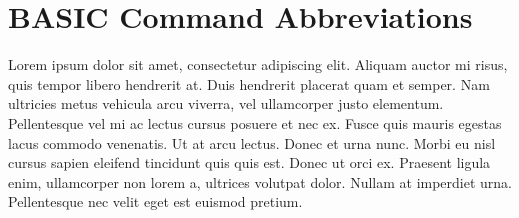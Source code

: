 \documentclass[
	11pt, %
	fleqn, %
	letterpaper, %
]{CommodoreBlueBook}
\begin{document}

\chapter{BASIC Command Abbreviations}

Lorem ipsum dolor sit amet, consectetur adipiscing elit. Aliquam auctor mi
	risus, quis tempor libero hendrerit at. Duis hendrerit placerat quam et
	semper. Nam ultricies metus vehicula arcu viverra, vel ullamcorper justo
	elementum. Pellentesque vel mi ac lectus cursus posuere et nec ex. Fusce
	quis mauris egestas lacus commodo venenatis. Ut at arcu lectus. Donec et
	urna nunc. Morbi eu nisl cursus sapien eleifend tincidunt quis quis est.
	Donec ut orci ex. Praesent ligula enim, ullamcorper non lorem a, ultrices
	volutpat dolor. Nullam at imperdiet urna. Pellentesque nec velit eget est
	euismod pretium.


\@openrighttrue\makeatother

\stopcontents[part] %


\cleardoublepage %
{} %
\printindex %
\end{document}

